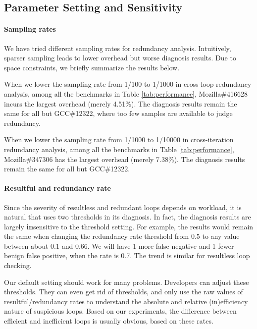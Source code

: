 \subsection{Parameter Setting and Sensitivity}
\label{sec:sensi}
\paragraph{Sampling rates}
We have tried different sampling rates for redundancy analysis.
Intuitively, sparser sampling leads to lower overhead but worse diagnosis
results. Due to space constraints, we briefly summarize the results below.

When we lower the sampling rate from 1/100 to 1/1000 
in cross-loop redundancy analysis,
among all the benchmarks in Table \ref{tab:performance},
Mozilla\#416628 incurs the largest overhead (merely 4.51\%). 
The diagnosis results remain the same for all but
GCC\#12322, where too few samples are available
to judge redundancy.

When we lower the sampling rate from 1/1000 to 1/10000
in cross-iteration redundancy analysis,
among all the benchmarks in Table \ref{tab:performance},
Mozilla\#347306 has the largest overhead (merely 7.38\%). 
The diagnosis results remain 
the same for all but GCC\#12322.

\paragraph{Resultful and redundancy rate}
Since the severity of resultless and redundant loops depends on
workload, it is natural that \Tool uses two thresholds in its diagnosis.
In fact, the diagnosis results are largely {\bf in}sensitive to the threshold
setting. For example, the results would remain the same when
changing the redundancy rate threshold from 0.5 to any value between about
0.1 and 0.66. We will have 1 more false negative and 1 fewer benign false positive, 
when the rate is 0.7. The trend is similar for resultless
loop checking. 

Our default setting %
should work for many problems.
Developers can adjust these thresholds. 
They can even get rid of thresholds, and only
use the raw values of resultful/redundancy rates to understand
the absolute and relative (in)efficiency nature of suspicious 
loops. Based on our experiments, the difference between efficient and inefficient
loops is usually obvious, based on these rates.

